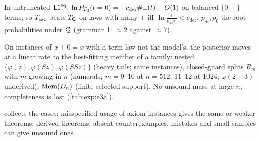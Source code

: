 \begin{conjecture}\identbrk{}\label{conj:ident:cder}
In untruncated $\mathord{\mathsf{L1}}^{\mathrm{eq}}$, $\ln P_{T_{\mathsf{Q}}}(t=0)=-c_{\mathrm{der}}\#_+(t)+O(1)$ on balanced $\{0,+\}$-terms; so $T_{\mathrm{esc}}$ beats $T_{\mathsf{Q}}$ on laws with many $+$ iff $\ln\frac1{p_+p_0}<c_{\mathrm{der}}$, $p_+,p_0$ the root probabilities under $\mathcal{Q}$ (grammar 1: $\approx2$ against $\approx7$).
\end{conjecture}

\begin{remark}\identbrk{}\label{rem:ident:e3a}
On instances of $x+0=x$ with a term law not the model's, the posterior moves at a linear rate to the best-fitting member of a family: nested $\{\varphi(z),\varphi(Sz),\varphi(SSz)\}$ (heavy tails; same instances), closed-guard splits $R_m$ with $m$ growing in $n$ (numerals; $m=9$--$10$ at $n=512$, $11$--$12$ at $1024$; $\varphi(2+3)$ underived), $\mathrm{Mem}(D_n)$ (finite selected support). No unsound mass at large $n$; completeness is lost (\cref{tab:exp:e3a}).
\end{remark}

\noindent {} collects the cases: misspecified usage of axiom instances gives the same or weaker theorems; derived theorems, absent counterexamples, mistakes and small samples can give unsound ones.

